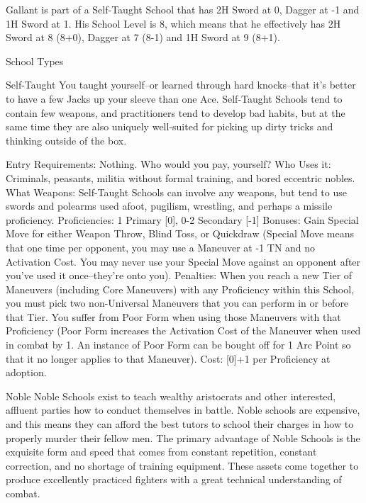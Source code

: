 \documentclass[oneside,11pt,english]{book}
\begin{document}
Gallant is part of a Self-Taught School that has 2H Sword at 0, Dagger at -1 and 1H Sword at 1. His 
School Level is 8, which means that he effectively has 2H Sword at 8 (8+0), Dagger at 7 (8-1) and 1H 
Sword at 9 (8+1). 


 

School Types 

 

Self-Taught 
You taught yourself--or learned through hard knocks--that it’s better to have a few Jacks up your sleeve 
than one Ace. Self-Taught Schools tend to contain few weapons, and practitioners tend to develop bad 
habits, but at the same time they are also uniquely well-suited for picking up dirty tricks and thinking 
outside of the box. 

 

Entry Requirements: Nothing. Who would you pay, yourself? 
Who Uses it: Criminals, peasants, militia without formal training, and bored eccentric nobles. 
What Weapons: Self-Taught Schools can involve any weapons, but tend to use swords and polearms 
used afoot, pugilism, wrestling, and perhaps a missile proficiency. 
Proficiencies: 1 Primary [0], 0-2 Secondary [-1] 
Bonuses: Gain Special Move for either Weapon Throw, Blind Toss, or Quickdraw (Special Move means 
that one time per opponent, you may use a Maneuver at -1 TN and no Activation Cost. You may never 
use your Special Move against an opponent after you’ve used it once--they’re onto you). 
Penalties: When you reach a new Tier of Maneuvers (including Core Maneuvers) with any Proficiency 
within this School, you must pick two non-Universal Maneuvers that you can perform in or before that 
Tier. You suffer from Poor Form when using those Maneuvers with that Proficiency (Poor Form 
increases the Activation Cost of the Maneuver when used in combat by 1. An instance of Poor Form can 
be bought off for 1 Arc Point so that it no longer applies to that Maneuver). 
Cost: [0]+1 per Proficiency at adoption. 

 

Noble 
Noble Schools exist to teach wealthy aristocrats and other interested, affluent parties how to conduct 
themselves in battle. Noble schools are expensive, and this means they can afford the best tutors to school 
their charges in how to properly murder their fellow men. The primary advantage of Noble Schools is the 
exquisite form and speed that comes from constant repetition, constant correction, and no shortage of 
training equipment. These assets come together to produce excellently practiced fighters with a great 
technical understanding of combat. 
\end{document}
